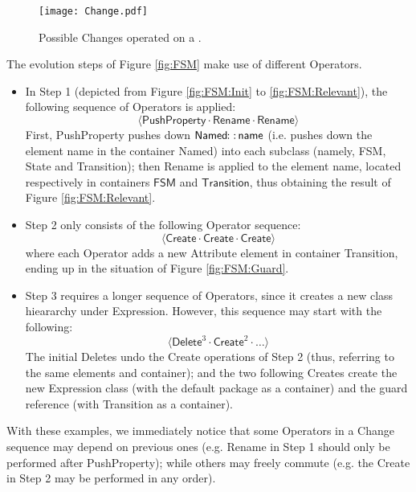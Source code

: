 \begin{figure}[t]
    \centering
    \texttt{[image: Change.pdf]}
    \caption{Possible \textsf{Change}s operated on a \metamodel.
        }
    \label{fig:Change}
\end{figure}

The evolution steps of Figure \ref{fig:FSM} make use of different \textsf{Operator}s.
\begin{itemize}
	\item In Step 1 (depicted from Figure \ref{fig:FSM:Init} to \ref{fig:FSM:Relevant}),
	the following sequence of \textsf{Operator}s is applied:
	$$\langle \mathsf{PushProperty} \cdot \mathsf{Rename} \cdot \mathsf{Rename} \rangle$$
	First, \textsf{PushProperty} pushes down $\mathsf{Named} \!\colon\!\colon\! \mathsf{name}$
	(i.e. pushes down the \textsf{element} \textsf{name} in the \textsf{container}
	\textsf{Named})
	into each subclass (namely, \textsf{FSM}, \textsf{State} and \textsf{Transition});
	then \textsf{Rename} is applied to the \textsf{element} \textsf{name}, 
	located respectively in \textsf{container}s $\mathsf{FSM}$ and 
	$\mathsf{Transition}$, thus obtaining the result of Figure \ref{fig:FSM:Relevant}.
	
	\item Step 2 only consists of the following \textsf{Operator} sequence:
	$$\langle \mathsf{Create} \cdot \mathsf{Create} \cdot \mathsf{Create} \rangle$$
	where each \textsf{Operator} adds a new Attribute \textsf{element} in 
	\textsf{container} \textsf{Transition}, ending up in the situation of
	Figure \ref{fig:FSM:Guard}.
	
	\item Step 3 requires a longer sequence of \textsf{Operator}s, since it creates
	a new class hieararchy under \textsf{Expression}. However, this sequence may
	start with the following:
	$$\langle \mathsf{Delete}^3 \cdot \mathsf{Create}^2 \cdot \ldots \rangle$$
	The initial \textsf{Delete}s undo the \textsf{Create} operations of Step 2
	(thus, referring to the same \textsf{element}s and \textsf{container}); and
	the two following \textsf{Create}s create the new \textsf{Expression} class
	(with the default package as a \textsf{container}) and the \textsf{guard}
	reference (with \textsf{Transition} as a \textsf{container}).
\end{itemize}
With these examples, we immediately notice that some \textsf{Operator}s
in a \textsf{Change} sequence may depend on previous ones (e.g. \textsf{Rename}
in Step 1 should only be performed after \textsf{PushProperty}); while others
may freely commute (e.g. the \textsf{Create} in Step 2 may be performed in any 
order).